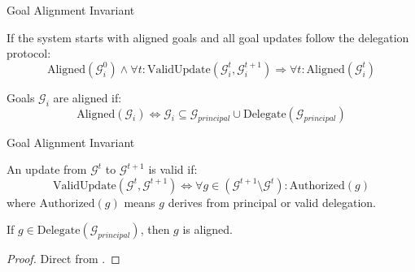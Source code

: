 \documentclass[
  ignorenonframetext,
]{beamer}
\providecommand{\cref}[1]{\texttt{\detokenize{#1}}}
\begin{document}
\begin{frame}[allowframebreaks]{Goal Alignment Invariant}
\begin{theorem}
\label{thm:goal-alignment-restated}
If the system starts with aligned goals and all goal updates follow the delegation protocol:
\begin{equation}
\label{eq:goal-alignment-restated}
\text{Aligned}(\mathcal{G}_i^0) \land \forall t: \text{ValidUpdate}(\mathcal{G}_i^t, \mathcal{G}_i^{t+1}) \Rightarrow \forall t: \text{Aligned}(\mathcal{G}_i^t)
\end{equation}
\end{theorem}

\begin{definition}
\label{def:goal-alignment}
Goals $\mathcal{G}_i$ are aligned if:
\begin{equation}
\label{eq:goal-alignment-def}
\text{Aligned}(\mathcal{G}_i) \iff \mathcal{G}_i \subseteq \mathcal{G}_{principal} \cup \text{Delegate}(\mathcal{G}_{principal})
\end{equation}
\end{definition}

\end{frame}

\begin{frame}[allowframebreaks]{Goal Alignment Invariant}
\begin{definition}
\label{def:valid-update}
An update from $\mathcal{G}^t$ to $\mathcal{G}^{t+1}$ is valid if:
\begin{equation}
\label{eq:valid-update}
\text{ValidUpdate}(\mathcal{G}^t, \mathcal{G}^{t+1}) \iff \forall g \in (\mathcal{G}^{t+1} \setminus \mathcal{G}^t): \text{Authorized}(g)
\end{equation}
where $\text{Authorized}(g)$ means $g$ derives from principal or valid delegation.
\end{definition}

\begin{lemma}
\label{lem:delegation-preserves}
If $g \in \text{Delegate}(\mathcal{G}_{principal})$, then $g$ is aligned.
\end{lemma}

\begin{proof}
Direct from \cref{def:goal-alignment}.
\end{proof}

\end{frame}
\end{document}
